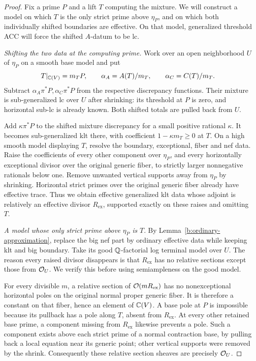 \begin{proof}
Fix a prime \(P\) and a lift \(T\) computing the mixture. We will
construct a model on which \(T\) is the only strict prime above \(\eta_P\), and
on which both individually shifted boundaries are effective. On that
model, generalized threshold ACC will force the shifted \(A\)-datum
to be lc.

\medskip\noindent
\emph{Shifting the two data at the computing prime.}
Work over an open neighborhood \(U\) of \(\eta_P\) on a smooth base
model and put
\[
 T|_{\mathbb C(V)}=m_TP,\qquad
 \alpha_A=A(T)/m_T,\qquad \alpha_C=C(T)/m_T.
\]
Subtract \(\alpha_A\pi^*P,\alpha_C\pi^*P\) from the respective
discrepancy functions. Their mixture is sub-generalized lc over \(U\)
after shrinking: its threshold at \(P\) is zero, and horizontal sub-lc
is already known. Both shifted totals are pulled back from \(U\).

Add \(\kappa\pi^*P\) to the shifted mixture discrepancy for a small
positive rational \(\kappa\). It becomes sub-generalized klt there,
with coefficient \(1-\kappa m_T\ge0\) at \(T\). On a high smooth
model displaying \(T\), resolve the boundary, exceptional, fiber and
nef data. Raise the coefficients of every other component over
\(\eta_P\), and every horizontally exceptional divisor over the
original generic fiber, to strictly larger nonnegative rationals
below one. Remove unwanted vertical supports away from \(\eta_P\)
by shrinking. Horizontal strict primes over the original generic
fiber already have effective trace. Thus we obtain effective
generalized klt data whose adjoint is relatively an effective divisor
\(R_{\mathrm{ex}}\), supported exactly on these raises and omitting
\(T\).

\medskip\noindent
\emph{A model whose only strict prime above \(\eta_P\) is \(T\).}
By Lemma~\ref{b:ordinary-approximation}, replace the big nef part by
ordinary effective data while keeping klt and big boundary.
Take its good \(\mathbb Q\)-factorial log terminal model over \(U\).
The reason every raised divisor disappears is that
\(R_{\mathrm{ex}}\) has no relative sections except those from
\(\mathcal O_U\). We verify this before using semiampleness on the good
model.

For every divisible \(m\), a relative section of
\(\mathcal O(mR_{\mathrm{ex}})\) has no nonexceptional horizontal poles
on the original normal proper generic fiber. It is therefore a
constant on that fiber, hence an element of \(\mathbb C(V)\).
A base pole at \(P\) is impossible because its pullback has a pole
along \(T\), absent from \(R_{\mathrm{ex}}\). At every other retained
base prime, a component missing from \(R_{\mathrm{ex}}\) likewise
prevents a pole. Such a component exists above each strict prime of
a normal contraction base, by pulling back a local equation near its
generic point; other vertical supports were removed by the shrink.
Consequently these relative section sheaves are precisely \(\mathcal O_U\).


\end{proof}
